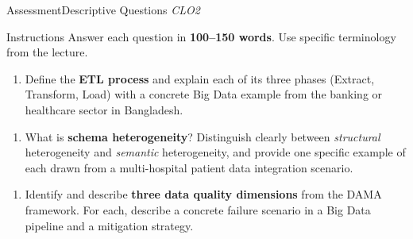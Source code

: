 \documentclass[aspectratio=169,10pt]{beamer}
\begin{document}
\begin{frame}{Assessment\textemdash Descriptive Questions \hfill\small\textit{CLO2}}
  \begin{block}{Instructions}
    Answer each question in \textbf{100--150 words}.  Use specific terminology from the lecture.
  \end{block}
  \vspace{10pt}
  \begin{enumerate}[\textbf{D1.}]
    \item Define the \textbf{ETL process} and explain each of its three phases (Extract, Transform, Load) with a concrete Big Data example from the banking or healthcare sector in Bangladesh.
  \end{enumerate}
  \vspace{8pt}
  \begin{enumerate}[\textbf{D2.}]
    \item What is \textbf{schema heterogeneity}?  Distinguish clearly between \emph{structural} heterogeneity and \emph{semantic} heterogeneity, and provide one specific example of each drawn from a multi-hospital patient data integration scenario.
  \end{enumerate}
  \vspace{8pt}
  \begin{enumerate}[\textbf{D3.}]
    \item Identify and describe \textbf{three data quality dimensions} from the DAMA framework.  For each, describe a concrete failure scenario in a Big Data pipeline and a mitigation strategy.
  \end{enumerate}
\end{frame}
\end{document}
